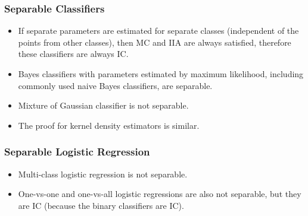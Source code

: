 \documentclass{beamer}
\begin{document}
\begin{frame} \frametitle{Separable Classifiers}
\begin{itemize}
\item If separate parameters are estimated for separate classes (independent of the points from other classes), then MC and IIA are always satisfied, therefore these classifiers are always IC.
\item Bayes classifiers with parameters estimated by maximum likelihood, including commonly used naive Bayes classifiers, are separable.
\item Mixture of Gaussian classifier is not separable.
\item The proof for kernel density estimators is similar.
\end{itemize}
\end{frame}

\begin{frame} \frametitle{Separable Logistic Regression}
\begin{itemize}
\item Multi-class logistic regression is not separable.
\item One-vs-one and one-vs-all logistic regressions are also not separable, but they are IC (because the binary classifiers are IC).
\end{itemize}
\end{frame}
\end{document}
